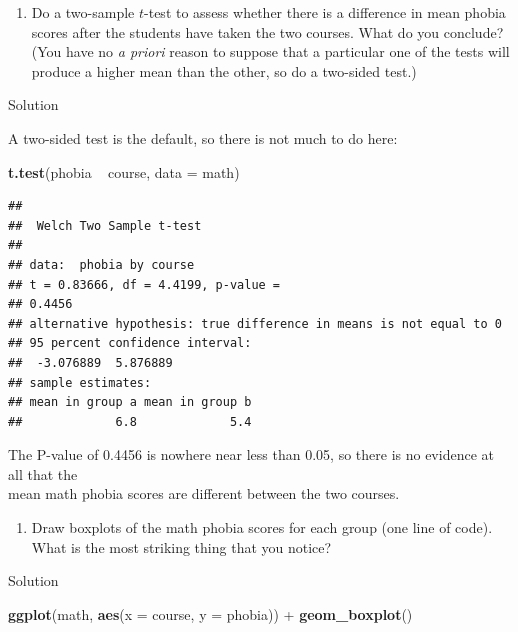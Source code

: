 \documentclass[]{tufte-book}
\newenvironment{Shaded}{}{}
\newcommand{\DataTypeTok}[1]{\textcolor[rgb]{0.56,0.13,0.00}{#1}}
\newcommand{\KeywordTok}[1]{\textcolor[rgb]{0.00,0.44,0.13}{\textbf{#1}}}
\newcommand{\NormalTok}[1]{#1}
\newcommand{\OperatorTok}[1]{\textcolor[rgb]{0.40,0.40,0.40}{#1}}
\newcommand{\StringTok}[1]{\textcolor[rgb]{0.25,0.44,0.63}{#1}}
\providecommand{\tightlist}{%
  \setlength{\itemsep}{0pt}\setlength{\parskip}{0pt}}
\theoremstyle{definition}
\theoremstyle{definition}
\theoremstyle{definition}
\theoremstyle{remark}
\begin{document}
\begin{enumerate}
\def\labelenumi{(\alph{enumi})}
\setcounter{enumi}{1}
\tightlist
\item
  Do a two-sample \(t\)-test to assess whether there is a difference in
  mean phobia scores after the students have taken the two courses. What
  do you conclude? (You have no \textsl{a
  priori}
  reason to suppose that a particular one of the tests will produce a
  higher mean than the other, so do a two-sided test.)
\end{enumerate}

Solution

A two-sided test is the default, so there is not much to do here:

\begin{Shaded}
\begin{Highlighting}[]
\KeywordTok{t.test}\NormalTok{(phobia }\OperatorTok{~}\StringTok{ }\NormalTok{course, }\DataTypeTok{data =}\NormalTok{ math)}
\end{Highlighting}
\end{Shaded}

\begin{verbatim}
## 
##  Welch Two Sample t-test
## 
## data:  phobia by course
## t = 0.83666, df = 4.4199, p-value =
## 0.4456
## alternative hypothesis: true difference in means is not equal to 0
## 95 percent confidence interval:
##  -3.076889  5.876889
## sample estimates:
## mean in group a mean in group b 
##             6.8             5.4
\end{verbatim}

The P-value of 0.4456 is nowhere near less than 0.05, so there is no
evidence at all that the\\
mean math phobia scores are different between the two courses.

\begin{enumerate}
\def\labelenumi{(\alph{enumi})}
\setcounter{enumi}{2}
\tightlist
\item
  Draw boxplots of the math phobia scores for each group (one line of
  code). What is the most striking thing that you notice?
\end{enumerate}

Solution

\begin{Shaded}
\begin{Highlighting}[]
\KeywordTok{ggplot}\NormalTok{(math, }\KeywordTok{aes}\NormalTok{(}\DataTypeTok{x =}\NormalTok{ course, }\DataTypeTok{y =}\NormalTok{ phobia)) }\OperatorTok{+}\StringTok{ }\KeywordTok{geom_boxplot}\NormalTok{()}
\end{Highlighting}
\end{Shaded}
\end{document}
